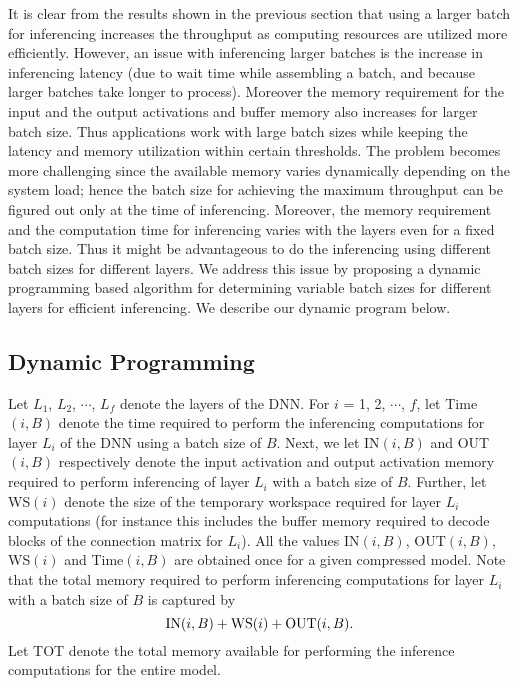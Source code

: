 \newcommand{\OUT} {{\rm OUT}}
\newcommand{\IN} {{\rm IN}}
\newcommand{\WS} {{\rm WS}}
\newcommand{\Time} {{\rm Time}}
\newcommand{\OPT} {{\rm OPT}}
\newcommand{\TOT} {{\rm TOT}}

It is clear from the results shown in the previous section that  using a larger batch for inferencing increases the 
throughput as computing
resources are utilized more efficiently.
However, an issue with inferencing larger batches is the increase
in inferencing latency 
(due to wait time while assembling a batch, and because
larger batches take longer to process). 
Moreover the memory requirement for the input and the output
activations and buffer memory also increases for larger batch size.
Thus applications work with large batch sizes while keeping
the latency and memory utilization within certain thresholds.
The problem becomes more challenging since the 
available memory varies dynamically depending on the system load;
hence the  batch size for achieving the maximum throughput can be figured out only at the time of inferencing.
Moreover, the memory requirement and the computation time for 
inferencing varies with the layers even for a fixed batch size. 
Thus it might be advantageous to do the inferencing using different 
batch sizes for different layers.
We address this issue by proposing a dynamic programming based algorithm
for determining variable batch sizes for different layers for efficient
inferencing.
We describe our dynamic program below.

\subsection{Dynamic Programming}
Let $L_1$, $L_2$, $\cdots$, $L_f$ denote the layers of the DNN. 
For $i$ = 1,  2, $\cdots$, $f$, let \Time$(i, B)$ denote the time required to perform the inferencing computations for layer $L_i$
of the DNN using a batch size of $B$.  
Next, we let \IN$(i,B)$ and \OUT$(i,B)$ respectively denote 
the input activation and output activation memory required
to perform inferencing of layer $L_i$ with a batch size of $B$. 
Further, let \WS$(i)$ denote the size of the temporary workspace  required for layer $L_i$ computations (for instance this includes
the buffer memory required to decode blocks of the connection matrix for $L_i$). 
All the values \IN$(i,B)$,  \OUT$(i,B)$, \WS$(i)$ and \Time$(i, B)$
are obtained once for a given compressed model.
Note that the total memory required to perform inferencing computations for layer $L_i$ with a batch size of $B$ is captured by
$$ \IN(i,B) + \WS(i) +  \OUT(i,B). $$
Let {\TOT} denote the total memory available for performing the inference
computations for the entire model.

